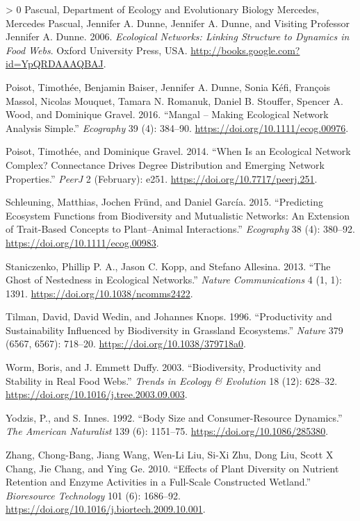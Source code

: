 \documentclass[10pt,oneside]{article}
\newlength{\cslhangindent}
\newenvironment{CSLReferences}[3] %
 {%
  \setlength{\parindent}{0pt}
  \ifodd #1 \everypar{\setlength{\hangindent}{\cslhangindent}}\ignorespaces\fi
  \ifnum #2 > 0
  \setlength{\parskip}{#2\baselineskip}
  \fi
 }%
 {}
\begin{document}
\begin{CSLReferences}{1}{0}
\leavevmode\hypertarget{ref-Pascual2006EcoNet}{}%
Pascual, Department of Ecology and Evolutionary Biology Mercedes,
Mercedes Pascual, Jennifer A. Dunne, Jennifer A. Dunne, and Visiting
Professor Jennifer A. Dunne. 2006. \emph{Ecological Networks: Linking
Structure to Dynamics in Food Webs}. Oxford University Press, USA.
\url{http://books.google.com?id=YpQRDAAAQBAJ}.

\leavevmode\hypertarget{ref-Poisot2016ManMak}{}%
Poisot, Timothée, Benjamin Baiser, Jennifer A. Dunne, Sonia Kéfi,
François Massol, Nicolas Mouquet, Tamara N. Romanuk, Daniel B. Stouffer,
Spencer A. Wood, and Dominique Gravel. 2016. {``Mangal -- Making
Ecological Network Analysis Simple.''} \emph{Ecography} 39 (4): 384--90.
\url{https://doi.org/10.1111/ecog.00976}.

\leavevmode\hypertarget{ref-Poisot2014WheEco}{}%
Poisot, Timothée, and Dominique Gravel. 2014. {``When Is an Ecological
Network Complex? Connectance Drives Degree Distribution and Emerging
Network Properties.''} \emph{PeerJ} 2 (February): e251.
\url{https://doi.org/10.7717/peerj.251}.

\leavevmode\hypertarget{ref-Schleuning2015PreEco}{}%
Schleuning, Matthias, Jochen Fründ, and Daniel García. 2015.
{``Predicting Ecosystem Functions from Biodiversity and Mutualistic
Networks: An Extension of Trait-Based Concepts to Plant--Animal
Interactions.''} \emph{Ecography} 38 (4): 380--92.
\url{https://doi.org/10.1111/ecog.00983}.

\leavevmode\hypertarget{ref-Staniczenko2013GhoNesa}{}%
Staniczenko, Phillip P. A., Jason C. Kopp, and Stefano Allesina. 2013.
{``The Ghost of Nestedness in Ecological Networks.''} \emph{Nature
Communications} 4 (1, 1): 1391.
\url{https://doi.org/10.1038/ncomms2422}.

\leavevmode\hypertarget{ref-Tilman1996ProSus}{}%
Tilman, David, David Wedin, and Johannes Knops. 1996. {``Productivity
and Sustainability Influenced by Biodiversity in Grassland
Ecosystems.''} \emph{Nature} 379 (6567, 6567): 718--20.
\url{https://doi.org/10.1038/379718a0}.

\leavevmode\hypertarget{ref-Worm2003BioPro}{}%
Worm, Boris, and J. Emmett Duffy. 2003. {``Biodiversity, Productivity
and Stability in Real Food Webs.''} \emph{Trends in Ecology \&
Evolution} 18 (12): 628--32.
\url{https://doi.org/10.1016/j.tree.2003.09.003}.

\leavevmode\hypertarget{ref-Yodzis1992BodSiz}{}%
Yodzis, P., and S. Innes. 1992. {``Body Size and Consumer-Resource
Dynamics.''} \emph{The American Naturalist} 139 (6): 1151--75.
\url{https://doi.org/10.1086/285380}.

\leavevmode\hypertarget{ref-Zhang2010EffPla}{}%
Zhang, Chong-Bang, Jiang Wang, Wen-Li Liu, Si-Xi Zhu, Dong Liu, Scott X
Chang, Jie Chang, and Ying Ge. 2010. {``Effects of Plant Diversity on
Nutrient Retention and Enzyme Activities in a Full-Scale Constructed
Wetland.''} \emph{Bioresource Technology} 101 (6): 1686--92.
\url{https://doi.org/10.1016/j.biortech.2009.10.001}.

\end{CSLReferences}
\end{document}

